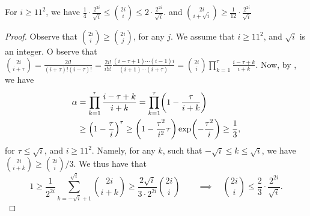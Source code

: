 \begin{lemma}
    For $i\geq 11^2$, we have
    \begin{math}
        \displaystyle \frac{1}{4} \cdot \frac{2^{2i}}{\sqrt{i}} \leq%
        \binom{2i}{i} \leq%
        2 \cdot \frac{2^{2i}}{\sqrt{i}}.
    \end{math}
    and
    \begin{math}
        \binom{2i}{i+\sqrt{i}}
        \geq%
        \frac{1}{12} \cdot
        \frac{2^{2i}}{\sqrt{i}}
    \end{math}

\end{lemma}
\begin{proof}
    Observe that $\binom{2i}{i} \geq \binom{2i}{j}$, for any $j$.  We
    assume that $i \geq 11^2$, and $\sqrt{i}$ is an integer. O bserve
    that
    \begin{math}
        \binom{2i}{i+\tau} =%
        \frac{2i!}{(i+\tau)! (i-\tau)!}%
        =%
        \frac{2i!}{i!i!}  \frac{(i-\tau+1) \cdots (i-1)i} {(i+1)
           \cdots (i+\tau)} =%
        \binom{2i}{i} \prod_{k=1}^\tau \frac{i-\tau+k}{i+k}.
    \end{math}
    Now, by , we have
    \begin{align*}
        \alpha
        &=%
        \prod_{k=1}^\tau \frac{i-\tau+k}{i+k}
        =%
        \prod_{k=1}^\tau \pth{ 1- \frac{\tau}{i+k}}
        \\&\geq 
        \pth{ 1- \frac{\tau}{i}}^\tau
        \geq
        \pth{ 1 - \frac{\tau^2}{i^2} \tau }
        \exp \pth{ -\frac{\tau^2}{i}}
        \geq
        \frac{1}{3},        
    \end{align*}
    for $\tau \leq \sqrt{i}$, and $i \geq 11^2$.  Namely, for any $k$,
    such that $-\sqrt{i} \leq k \leq \sqrt{i}$, we have
    $\binom{2i}{i+k} \geq \binom{2i}{i}/3$.  We thus have that
    \begin{equation*}
        1
        \geq 
        \frac{1}{2^{2i}}
        \sum_{k=-\sqrt{i}+1}^{\sqrt{i}} \binom{2i}{i+k}%
        \geq%
        \frac{2\sqrt{i}}{3\cdot 2^{2i}}  \binom{2i}{i}
        \qquad\implies\quad%
        \binom{2i}{i}
        \leq%
        \frac{2}{3} \cdot \frac{2^{2i}}{\sqrt{i}}.
    \end{equation*}




\end{proof}
